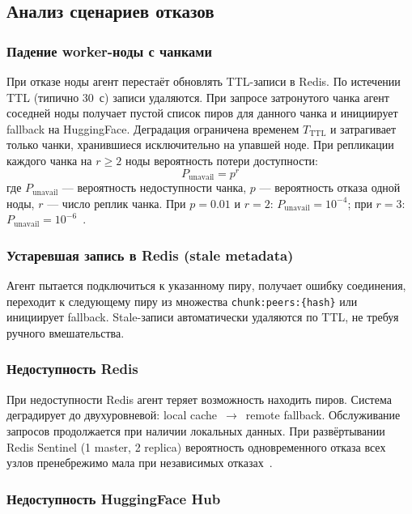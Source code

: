 \subsection{Анализ сценариев отказов}

\subsubsection{Падение worker-ноды с чанками}

При отказе ноды агент перестаёт обновлять TTL-записи в Redis. По истечении TTL (типично 30~с) записи удаляются. При запросе затронутого чанка агент соседней ноды получает пустой список пиров для данного чанка и инициирует fallback на HuggingFace. Деградация ограничена временем $T_{\mathrm{TTL}}$ и затрагивает только чанки, хранившиеся исключительно на упавшей ноде. При репликации каждого чанка на $r \geq 2$ ноды вероятность потери доступности:
\begin{equation}
  P_{\mathrm{unavail}} = p^r
\end{equation}
где $P_{\mathrm{unavail}}$ --- вероятность недоступности чанка, $p$ --- вероятность отказа одной ноды, $r$ --- число реплик чанка. При $p = 0.01$ и $r = 2$: $P_{\mathrm{unavail}} = 10^{-4}$; при $r = 3$: $P_{\mathrm{unavail}} = 10^{-6}$~\cite{ford2010availability}.

\subsubsection{Устаревшая запись в Redis (stale metadata)}

Агент пытается подключиться к указанному пиру, получает ошибку соединения, переходит к следующему пиру из множества \texttt{chunk:peers:\{hash\}} или инициирует fallback. Stale-записи автоматически удаляются по TTL, не требуя ручного вмешательства.

\subsubsection{Недоступность Redis}

При недоступности Redis агент теряет возможность находить пиров. Система деградирует до двухуровневой: local cache~$\to$~remote fallback. Обслуживание запросов продолжается при наличии локальных данных. При развёртывании Redis Sentinel (1 master, 2 replica) вероятность одновременного отказа всех узлов пренебрежимо мала при независимых отказах~\cite{redis_sentinel_docs}.

\subsubsection{Недоступность HuggingFace Hub}

